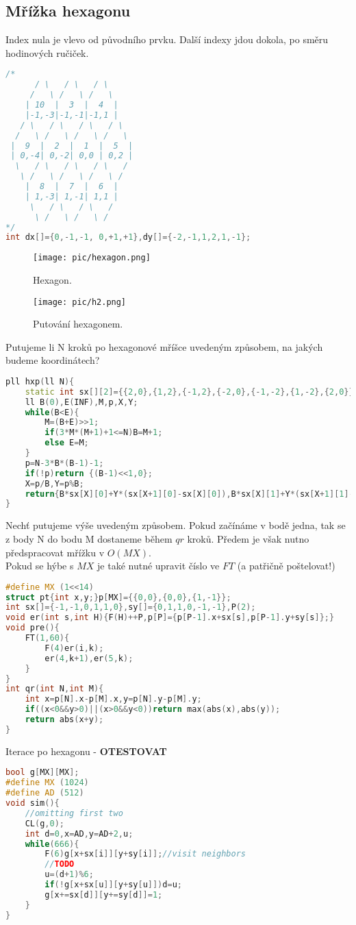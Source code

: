 \documentclass[11pt]{article}
\begin{document}
\subsection{Mřížka hexagonu}
Index nula je vlevo od původního prvku. Další indexy jdou dokola, po směru hodinových ručiček.
\begin{lstlisting}[language=C++]
/*
      / \   / \   / \
     /   \ /   \ /   \
    | 10  |  3  |  4  |
    |-1,-3|-1,-1|-1,1 |
   / \   / \   / \   / \
  /   \ /   \ /   \ /   \
 |  9  |  2  |  1  |  5  |
 | 0,-4| 0,-2| 0,0 | 0,2 |
  \   / \   / \   / \   /
   \ /   \ /   \ /   \ /
    |  8  |  7  |  6  |
    | 1,-3| 1,-1| 1,1 |
     \   / \   / \   /
      \ /   \ /   \ /
*/
int dx[]={0,-1,-1, 0,+1,+1},dy[]={-2,-1,1,2,1,-1};
\end{lstlisting}
\begin{figure}[H]
  \centering
  \texttt{[image: pic/hexagon.png]}
  \caption[Hexagon.]{Hexagon.}
\end{figure}
\begin{figure}[H]
  \centering
  \texttt{[image: pic/h2.png]}
  \caption[Putování hexagonem.]{Putování hexagonem.}
\end{figure}
Putujeme li N kroků po hexagonové mříšce uvedeným způsobem, na jakých budeme koordinátech?
\begin{lstlisting}[language=C++]
pll hxp(ll N){
    static int sx[][2]={{2,0},{1,2},{-1,2},{-2,0},{-1,-2},{1,-2},{2,0}};
    ll B(0),E(INF),M,p,X,Y;
    while(B<E){
        M=(B+E)>>1;
        if(3*M*(M+1)+1<=N)B=M+1;
        else E=M;
    }
    p=N-3*B*(B-1)-1;
	if(!p)return {(B-1)<<1,0};
    X=p/B,Y=p%B;
	return{B*sx[X][0]+Y*(sx[X+1][0]-sx[X][0]),B*sx[X][1]+Y*(sx[X+1][1]-sx[X][1])};
}
\end{lstlisting}
Nechť putujeme výše uvedeným způsobem. Pokud začínáme v bodě jedna, tak se z body \textsc{N} do bodu \textsf{M} dostaneme během $qr$ kroků. Předem je však nutno předspracovat mřížku  v $O(MX)$.
\\Pokud se hýbe s $MX$ je také nutné upravit číslo ve $FT$ (a patřičně poštelovat!)
\begin{lstlisting}[language=C++]
#define MX (1<<14)
struct pt{int x,y;}p[MX]={{0,0},{0,0},{1,-1}};
int sx[]={-1,-1,0,1,1,0},sy[]={0,1,1,0,-1,-1},P(2);
void er(int s,int H){F(H)++P,p[P]={p[P-1].x+sx[s],p[P-1].y+sy[s]};}
void pre(){
    FT(1,60){
        F(4)er(i,k);
        er(4,k+1),er(5,k);
    }
}
int qr(int N,int M){
    int x=p[N].x-p[M].x,y=p[N].y-p[M].y;
    if((x<0&&y>0)||(x>0&&y<0))return max(abs(x),abs(y));
    return abs(x+y);
}
\end{lstlisting}
Iterace po hexagonu - \textbf{OTESTOVAT}
\begin{lstlisting}[language=C++]
bool g[MX][MX];
#define MX (1024)
#define AD (512)
void sim(){
    //omitting first two
    CL(g,0);
    int d=0,x=AD,y=AD+2,u;
    while(666){
        F(6)g[x+sx[i]][y+sy[i]];//visit neighbors
        //TODO
        u=(d+1)%6;
        if(!g[x+sx[u]][y+sy[u]])d=u;
        g[x+=sx[d]][y+=sy[d]]=1;
    }
}
\end{lstlisting}
\end{document}
